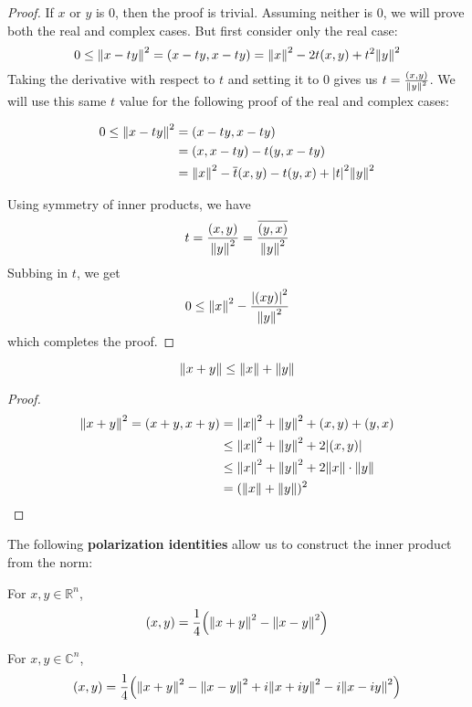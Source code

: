 \begin{proof}
If $x$ or $y$ is 0, then the proof is trivial. Assuming neither is 0, we will prove both the real and complex cases. But first consider only the real case: 
$$0 \leq \norm{x - ty}^{2} = (x - ty, x - ty) = \norm{x}^{2} - 2t(x, y) + t^{2} \norm{y}^{2} $$
Taking the derivative with respect to $t$ and setting it to 0 gives us $t = \frac{(x, y)}{\norm{y}^{2}}$. We will use this same $t$ value for the following proof of the real and complex cases:

$$
\begin{aligned}
0 \leq \norm{x-ty}^{2} &= (x - ty, x - ty) \\ 
&= (x, x - ty) -t(y, x - ty) \\
&= \norm{x}^{2} - \overline{t} (x, y) -t (y, x) + \abs{t}^{2} \norm{y}^{2}
\end{aligned}
$$

Using symmetry of inner products, we have 
$$t = \frac{(x, y)}{\norm{y}^{2}} = \frac{\overline{(y, x)}}{\norm{y}^{2}}$$
Subbing in $t$, we get 
$$ 0 \leq \norm{x}^{2} - \frac{\abs{(x y)}^{2}}{\norm{y}^{2}}$$
which completes the proof. 
\end{proof}

\begin{theorem}
$$\norm{x + y} \leq \norm{x} + \norm{y}$$
\end{theorem}

\begin{proof}
$$
\begin{aligned}
\norm{x + y}^{2} = (x + y, x + y) &= \norm{x}^{2} + \norm{y}^{2} + (x, y) + (y, x) \\
&\leq \norm{x}^{2} + \norm{y}^{2} + 2 \abs{(x, y)} \\
&\leq \norm{x}^{2} + \norm{y}^{2} + 2 \norm{x} \cdot \norm{y} \\
&= (\norm{x} + \norm{y})^{2}
\end{aligned}
$$
\end{proof}

\begin{theorem}
The following \textbf{polarization identities} allow us to construct the inner product from the norm: 

For $x, y \in \mathbb{R}^{n}$, 
$$(x, y) = \frac{1}{4} \Big( \norm{x + y}^{2} - \norm{x - y}^{2} \Big) $$

For $x, y \in \mathbb{C}^{n}$, 
$$(x, y) = \frac{1}{4} \Big( \norm{x + y}^{2} - \norm{x - y}^{2} +i \norm{x + iy}^{2} -i \norm{x - iy}^{2} \Big)$$
\end{theorem}

